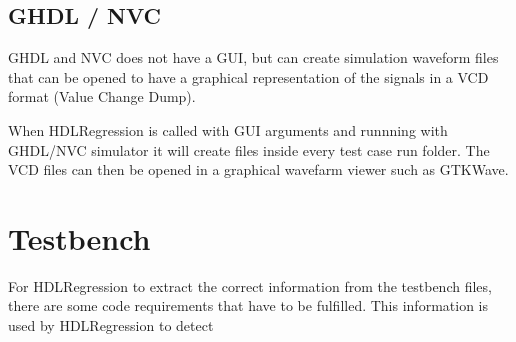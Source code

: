 \documentclass[letterpaper,10pt,english]{sphinxmanual}
\begin{document}
\section{GHDL / NVC}
\label{\detokenize{gui:ghdl-nvc}}
\sphinxAtStartPar
GHDL and NVC does not have a GUI, but can create simulation waveform files that can be opened to have a graphical representation
of the signals in a VCD format (Value Change Dump).

\sphinxAtStartPar
When HDLRegression is called with GUI arguments and runnning with GHDL/NVC simulator it will create  files
inside every test case run folder. The VCD files can then be opened in a graphical wavefarm viewer such as GTKWave.

\begin{sphinxVerbatim}[commandchars=\\\{\}]
\end{sphinxVerbatim}

\sphinxstepscope


\chapter{Testbench}
\label{\detokenize{testbench:testbench}}\label{\detokenize{testbench::doc}}
\sphinxAtStartPar
For HDLRegression to extract the correct information from the testbench files, there are some
code requirements that have to be fulfilled. This information is used by HDLRegression to
detect
\end{document}
